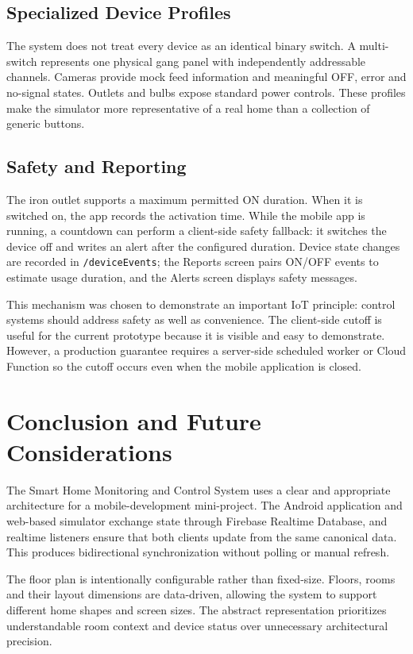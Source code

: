 \documentclass[11pt,a4paper]{article}
\begin{document}
\subsection{Specialized Device Profiles}
The system does not treat every device as an identical binary switch. A multi-switch represents one physical gang panel with independently addressable channels. Cameras provide mock feed information and meaningful OFF, error and no-signal states. Outlets and bulbs expose standard power controls. These profiles make the simulator more representative of a real home than a collection of generic buttons.

\subsection{Safety and Reporting}
The iron outlet supports a maximum permitted ON duration. When it is switched on, the app records the activation time. While the mobile app is running, a countdown can perform a client-side safety fallback: it switches the device off and writes an alert after the configured duration. Device state changes are recorded in \texttt{/deviceEvents}; the Reports screen pairs ON/OFF events to estimate usage duration, and the Alerts screen displays safety messages.

This mechanism was chosen to demonstrate an important IoT principle: control systems should address safety as well as convenience. The client-side cutoff is useful for the current prototype because it is visible and easy to demonstrate. However, a production guarantee requires a server-side scheduled worker or Cloud Function so the cutoff occurs even when the mobile application is closed.

\newpage
\section{Conclusion and Future Considerations}
The Smart Home Monitoring and Control System uses a clear and appropriate architecture for a mobile-development mini-project. The Android application and web-based simulator exchange state through Firebase Realtime Database, and realtime listeners ensure that both clients update from the same canonical data. This produces bidirectional synchronization without polling or manual refresh.

The floor plan is intentionally configurable rather than fixed-size. Floors, rooms and their layout dimensions are data-driven, allowing the system to support different home shapes and screen sizes. The abstract representation prioritizes understandable room context and device status over unnecessary architectural precision.
\end{document}
